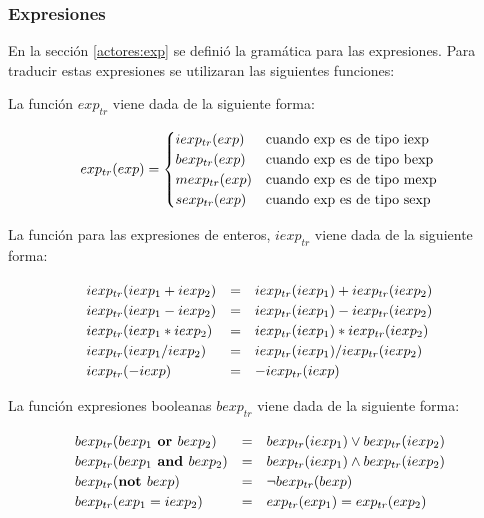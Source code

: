 \subsubsection*{Expresiones}

En la sección \ref{actores:exp} se definió la gramática para las expresiones. Para traducir estas expresiones se utilizaran las siguientes funciones:

La función $exp_{tr}$ viene dada de la siguiente forma:

\begin{equation*}
  exp_{tr}(exp) =
  \setlength{\arraycolsep}{0pt}
  \renewcommand{\arraystretch}{1.2}
  \left\{\begin{array}{l @{\quad} l}
        iexp_{tr}(exp)    & \text{cuando exp es de tipo iexp} \\
        bexp_{tr}(exp)    & \text{cuando exp es de tipo bexp} \\
        mexp_{tr}(exp)    & \text{cuando exp es de tipo mexp} \\
        sexp_{tr}(exp)    & \text{cuando exp es de tipo sexp} \\
  \end{array}\right.
\end{equation*}

La función para las expresiones de enteros, $iexp_{tr}$ viene dada de la siguiente forma:

\begin{equation*}
\begin{array}{l c l}
iexp_{tr}(iexp_1 + iexp_2) &=& iexp_{tr}(iexp_1) + iexp_{tr}(iexp_2) \\
iexp_{tr}(iexp_1 - iexp_2) &=& iexp_{tr}(iexp_1) - iexp_{tr}(iexp_2) \\
iexp_{tr}(iexp_1 * iexp_2) &=& iexp_{tr}(iexp_1) * iexp_{tr}(iexp_2) \\ 
iexp_{tr}(iexp_1 / iexp_2) &=& iexp_{tr}(iexp_1) / iexp_{tr}(iexp_2) \\
iexp_{tr}(- iexp) &=& - iexp_{tr}(iexp)
\end{array}
\end{equation*}

La función expresiones booleanas $bexp_{tr}$ viene dada de la siguiente forma:

\begin{equation*}
\begin{array}{l c l}
bexp_{tr}(bexp_1 \textbf{ or } bexp_2) &=& bexp_{tr}(iexp_1) \vee bexp_{tr}(iexp_2) \\
bexp_{tr}(bexp_1 \textbf{ and } bexp_2) &=& bexp_{tr}(iexp_1) \wedge bexp_{tr}(iexp_2) \\
bexp_{tr}(\textbf{not } bexp) &=& \neg bexp_{tr}(bexp) \\ 
bexp_{tr}(exp_1 = iexp_2) &=& exp_{tr}(exp_1) = exp_{tr}(exp_2) \\
\end{array}
\end{equation*}

